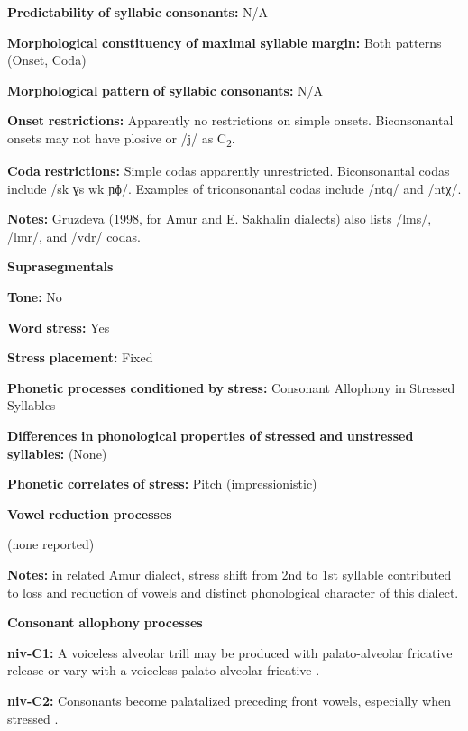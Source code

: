 \textbf{Predictability} \textbf{of} \textbf{syllabic} \textbf{consonants:} N/A

\textbf{Morphological} \textbf{constituency} \textbf{of} \textbf{maximal} \textbf{syllable} \textbf{margin:} Both patterns (Onset, Coda)

\textbf{Morphological} \textbf{pattern} \textbf{of} \textbf{syllabic} \textbf{consonants:} N/A

\textbf{Onset} \textbf{restrictions:} Apparently no restrictions on simple onsets. Biconsonantal onsets may not have plosive or /j/ as C\textsubscript{2}.

\textbf{Coda} \textbf{restrictions:} Simple codas apparently unrestricted. Biconsonantal codas include /sk ɣs wk ɲɸ/. Examples of triconsonantal codas include /ntq/ and /ntχ/.

\textbf{Notes:} Gruzdeva (1998, for Amur and E. Sakhalin dialects) also lists /lms/, /lmr/, and /vdr/ codas.

\textbf{Suprasegmentals}

\textbf{Tone:} No

\textbf{Word} \textbf{stress:} Yes

\textbf{Stress} \textbf{placement:} Fixed

\textbf{Phonetic} \textbf{processes} \textbf{conditioned} \textbf{by} \textbf{stress:} Consonant Allophony in Stressed Syllables

\textbf{Differences} \textbf{in} \textbf{phonological} \textbf{properties} \textbf{of} \textbf{stressed} \textbf{and} \textbf{unstressed} \textbf{syllables:} (None)

\textbf{Phonetic} \textbf{correlates} \textbf{of} \textbf{stress:} Pitch (impressionistic)

\textbf{Vowel} \textbf{reduction} \textbf{processes}

(none reported)

\textbf{Notes:} in related Amur dialect, stress shift from 2nd to 1st syllable contributed to loss and reduction of vowels and distinct phonological character of this dialect.

\textbf{Consonant} \textbf{allophony} \textbf{processes}

\textbf{niv-C1:} A voiceless alveolar trill may be produced with palato-alveolar fricative release or vary with a voiceless palato-alveolar fricative \citep[26]{Shiraishi2006}.

\textbf{niv-C2:} Consonants become palatalized preceding front vowels, especially when stressed \citep[23]{Shiraishi2006}.

